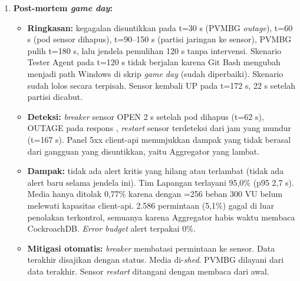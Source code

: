 \begin{enumerate}
\begin{center}
\begin{tabularx}{\linewidth}{|X|X|}
\end{tabularx}
\end{center}
\item \textbf{Post-mortem \textit{game day}:}
\begin{itemize}
\item \textbf{Ringkasan:} kegagalan disuntikkan pada t=30 s (PVMBG \textit{outage}), t=60 s (pod sensor dihapus), t=90--150 s (partisi jaringan ke sensor), PVMBG pulih t=180 s, lalu jendela pemulihan 120 s tanpa intervensi. Skenario Tester Agent pada t=120 s tidak berjalan karena Git Bash mengubah  menjadi path Windows di skrip \textit{game day} (sudah diperbaiki). Skenario  sudah lolos secara terpisah. Sensor kembali UP pada t=172 s, 22 s setelah partisi dicabut.
\item \textbf{Deteksi:} \textit{breaker} sensor OPEN 2 s setelah pod dihapus (t=62 s),  OUTAGE pada respons , \textit{restart} sensor terdeteksi dari jam yang mundur (t=167 s). Panel 5xx client-api menunjukkan dampak yang tidak berasal dari gangguan yang disuntikkan, yaitu Aggregator yang lambat.
\item \textbf{Dampak:} tidak ada alert kritis yang hilang atau terlambat (tidak ada alert baru selama jendela ini). Tim Lapangan terlayani 95,0\% (p95 2,7 s). Media hanya ditolak 0,77\% karena dengan =256 beban 300 VU belum melewati kapasitas client-api. 2.586 permintaan (5,1\%) gagal di luar penolakan terkontrol, semuanya karena Aggregator habis waktu membaca CockroachDB. \textit{Error budget} alert terpakai 0\%.
\item \textbf{Mitigasi otomatis:} \textit{breaker} membatasi permintaan ke sensor. Data terakhir disajikan dengan status. Media di-\textit{shed}. PVMBG dilayani dari data terakhir. Sensor \textit{restart} ditangani dengan membaca dari awal.

\end{itemize}
\end{enumerate}
